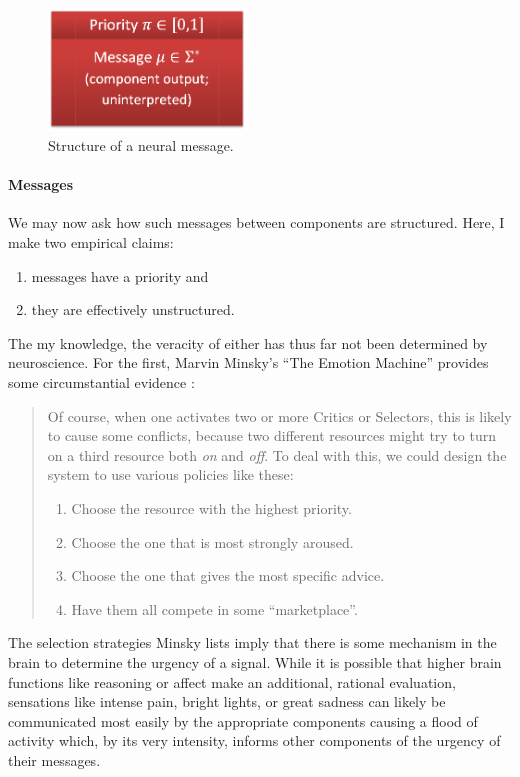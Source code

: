 \documentclass[]{scrartcl}
\begin{document}
\begin{figure}[!h]
	\centering
	\includegraphics[width=150pt]{figs/message.png}
	\caption{Structure of a neural message.}
	\label{fig:message}
\end{figure}

\paragraph{Messages}

We may now ask how such messages between components are structured. Here, I make two empirical claims:
\begin{enumerate}
	\item messages have a priority and
	\item they are effectively unstructured.
\end{enumerate}

The my knowledge, the veracity of either has thus far not been determined by neuroscience. For the first, Marvin Minsky's ``The Emotion Machine'' provides some circumstantial evidence \cite[p. 222]{emotionMachine}:

\begin{quote}
	Of course, when one activates two or more Critics or Selectors, this is likely to cause some conflicts, because two different resources might try to turn on a third resource both {\em on} and {\em off}. To deal with this, we could design the system to use various policies like these:
	
	\begin{enumerate}
		\item Choose the resource with the highest priority.
		\item Choose the one that is most strongly aroused.
		\item Choose the one that gives the most specific advice.
		\item Have them all compete in some ``marketplace''.
	\end{enumerate}
\end{quote}

The selection strategies Minsky lists imply that there is some mechanism in the brain to determine the urgency of a signal. While it is possible that higher brain functions like reasoning or affect make an additional, rational evaluation, sensations like intense pain, bright lights, or great sadness can likely be communicated most easily by the appropriate components causing a flood of activity which, by its very intensity, informs other components of the urgency of their messages.
\end{document}
